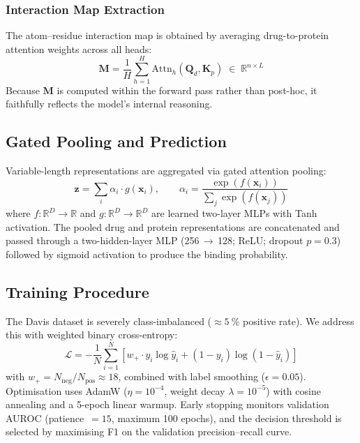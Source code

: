 \documentclass[fleqn,10pt]{wlscirep}
\begin{document}
\subsubsection{Interaction Map Extraction}

The atom--residue interaction map is obtained by averaging drug-to-protein
attention weights across all heads:
\begin{equation}
\mathbf{M} = \frac{1}{H}\sum_{h=1}^{H}
  \mathrm{Attn}_h(\mathbf{Q}_d,\mathbf{K}_p)
  \;\in\;\mathbb{R}^{n\times L}
\label{eq:interaction_map}
\end{equation}
Because $\mathbf{M}$ is computed within the forward pass rather than post-hoc,
it faithfully reflects the model's internal reasoning.

\subsection{Gated Pooling and Prediction}

Variable-length representations are aggregated via gated attention pooling:
\begin{equation}
\mathbf{z} = \sum_{i}\alpha_i\cdot g(\mathbf{x}_i),\qquad
\alpha_i = \frac{\exp(f(\mathbf{x}_i))}{\sum_j\exp(f(\mathbf{x}_j))}
\end{equation}
where $f\colon\mathbb{R}^D\to\mathbb{R}$ and
$g\colon\mathbb{R}^D\to\mathbb{R}^D$ are learned two-layer MLPs with Tanh
activation.  The pooled drug and protein representations are concatenated and
passed through a two-hidden-layer MLP (256\,$\to$\,128; ReLU; dropout $p=0.3$)
followed by sigmoid activation to produce the binding probability.

\subsection{Training Procedure}

The Davis dataset is severely class-imbalanced (${\approx}\SI{5}{\percent}$
positive rate).  We address this with weighted binary cross-entropy:
\begin{equation}
\mathcal{L} = -\frac{1}{N}\sum_{i=1}^{N}\left[
  w_+\cdot y_i\log\hat{y}_i + (1-y_i)\log(1-\hat{y}_i)
\right]
\end{equation}
with $w_+ = N_\text{neg}/N_\text{pos}\approx 18$, combined with label smoothing
($\epsilon=0.05$).  Optimisation uses AdamW\cite{loshchilov2019decoupled}
($\eta=10^{-4}$, weight decay $\lambda=10^{-5}$) with cosine annealing and a
5-epoch linear warmup.  Early stopping monitors validation AUROC (patience~$=15$,
maximum 100 epochs), and the decision threshold is selected by maximising F1
on the validation precision--recall curve.
\end{document}
